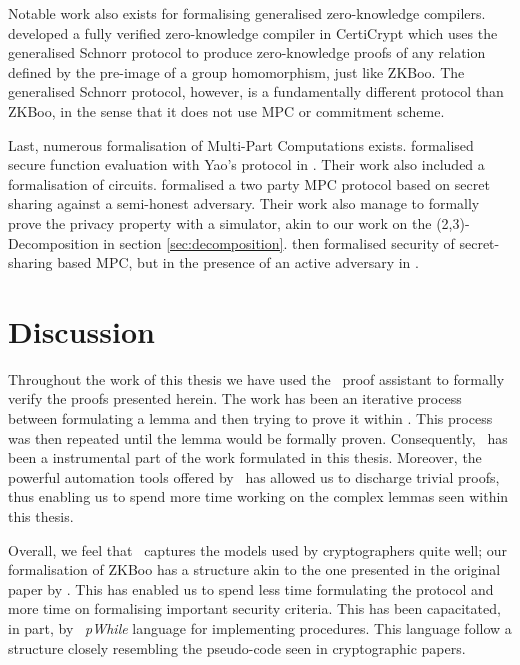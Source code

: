 Notable work also exists for formalising generalised zero-knowledge compilers.
\citet{zkcrypt} developed a fully verified zero-knowledge compiler in CertiCrypt
which uses the generalised Schnorr protocol to produce zero-knowledge proofs of
any relation defined by the pre-image of a group homomorphism, just like ZKBoo.
The generalised Schnorr protocol, however, is a fundamentally different protocol
than ZKBoo, in the sense that it does not use MPC or commitment scheme.

Last, numerous formalisation of Multi-Part Computations exists.
\citet{Yao} formalised secure function evaluation with Yao's protocol in
\easycrypt.
Their work also included a formalisation of circuits.
\citet{DBLP:journals/corr/abs-1805-12482} formalised a two party MPC protocol
based on secret sharing against a semi-honest adversary. Their work also manage
to formally prove the privacy property with a simulator, akin to our work on the
(2,3)-Decomposition in section \ref{sec:decomposition}.
\citet{DBLP:journals/corr/abs-1806-07197} then formalised security of
secret-sharing based MPC, but in the presence of an active adversary in \easycrypt.

\section{Discussion}
\label{sec:discussion}
Throughout the work of this thesis we have used the \easycrypt\ proof assistant
to formally verify the proofs presented herein.
The work has been an iterative process between formulating a lemma and then
trying to prove it within \easycrypt. This process was then repeated until the
lemma would be formally proven. Consequently, \easycrypt\ has been a
instrumental part of the work formulated in this thesis. Moreover, the powerful
automation tools offered by \easycrypt\ has allowed us to discharge trivial
proofs, thus enabling us to spend more time working on the complex lemmas seen
within this thesis.

Overall, we feel that \easycrypt\ captures the models used by cryptographers
quite well; our formalisation of ZKBoo has a structure akin to the one presented
in the original paper by \citet{zkboo}. This has enabled us to spend less time
formulating the protocol and more time on formalising important security criteria.
This has been capacitated, in part, by \easycrypt\ \textit{pWhile} language for
implementing procedures. This language follow a structure closely resembling the
pseudo-code seen in cryptographic papers.

